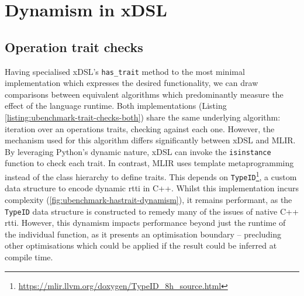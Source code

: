 















\section{Dynamism in xDSL}


\subsection{Operation trait checks}

Having specialised xDSL's \texttt{has_trait} method to the most minimal implementation which expresses the desired functionality, we can draw comparisons between equivalent algorithms which predominantly measure the effect of the language runtime.
Both implementations (Listing \ref{listing:ubenchmark-trait-checks-both}) share the same underlying algorithm: iteration over an operations traits, checking against each one. However, the mechanism used for this algorithm differs significantly between xDSL and MLIR.
By leveraging Python's dynamic nature, xDSL can invoke the \texttt{isinstance} function to check each trait. In contrast, MLIR uses template metaprogramming instead of the class hierarchy to define traits. This depends on \texttt{TypeID}\footnote{\scriptsize{\url{https://mlir.llvm.org/doxygen/TypeID_8h_source.html}}}, a custom data structure to encode dynamic \ac{rtti} in C++.
Whilst this implementation incurs complexity (\autoref{fig:ubenchmark-hastrait-dynamism}), it remains performant, as the \texttt{TypeID} data structure is constructed to remedy many of the issues of native C++ \ac{rtti}.
However, this dynamism impacts performance beyond just the runtime of the individual function, as it presents an optimisation boundary -- precluding other optimisations which could be applied if the result could be inferred at compile time. %

